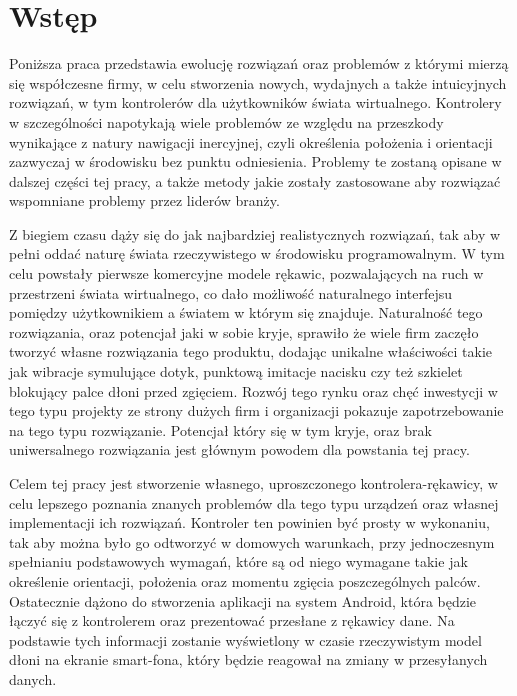 \chapter{Wstęp}
\label{ch:wstep}
Poniższa praca przedstawia ewolucję rozwiązań oraz problemów z którymi mierzą się współczesne firmy, w celu stworzenia nowych, wydajnych a także intuicyjnych rozwiązań, w tym kontrolerów dla użytkowników świata wirtualnego. Kontrolery w szczególności napotykają wiele problemów ze względu na przeszkody wynikające z natury nawigacji inercyjnej, czyli określenia położenia i orientacji zazwyczaj w środowisku bez punktu odniesienia. Problemy te zostaną opisane w dalszej części tej pracy, a także metody jakie zostały zastosowane aby rozwiązać wspomniane problemy przez liderów branży.

Z biegiem czasu dąży się do jak najbardziej realistycznych rozwiązań, tak aby w pełni oddać naturę świata rzeczywistego w środowisku programowalnym. W tym celu powstały pierwsze komercyjne modele rękawic, pozwalających na ruch w przestrzeni świata wirtualnego, co dało możliwość naturalnego interfejsu pomiędzy użytkownikiem a światem w którym się znajduje. Naturalność tego rozwiązania, oraz potencjał jaki w sobie kryje, sprawiło że wiele firm zaczęło tworzyć własne rozwiązania tego produktu, dodając unikalne właściwości takie jak wibracje symulujące dotyk, punktową imitacje nacisku czy też szkielet blokujący palce dłoni przed zgięciem. Rozwój tego rynku oraz chęć inwestycji w tego typu projekty ze strony dużych firm i organizacji pokazuje zapotrzebowanie na tego typu rozwiązanie. Potencjał który się w tym kryje, oraz brak uniwersalnego rozwiązania jest głównym powodem dla powstania tej pracy.

Celem tej pracy jest stworzenie własnego, uproszczonego kontrolera-rękawicy, w celu lepszego poznania znanych problemów dla tego typu urządzeń oraz własnej implementacji ich rozwiązań. Kontroler ten powinien być prosty w wykonaniu, tak aby można było go odtworzyć w domowych warunkach, przy jednoczesnym spełnianiu podstawowych wymagań, które są od niego wymagane takie jak określenie orientacji, położenia oraz momentu zgięcia poszczególnych palców. Ostatecznie dążono do stworzenia aplikacji na system Android, która będzie łączyć się z kontrolerem oraz prezentować przesłane z rękawicy dane. Na podstawie tych informacji zostanie wyświetlony w czasie rzeczywistym model dłoni na ekranie smart-fona, który będzie reagował na zmiany w przesyłanych danych.